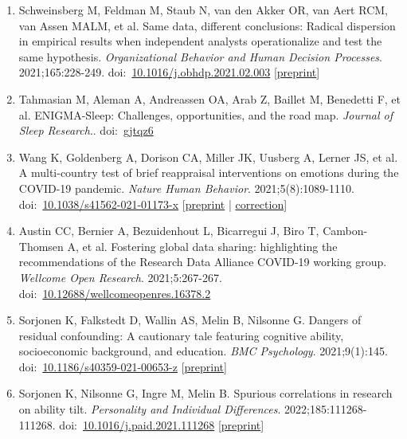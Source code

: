 \documentclass[10pt,a4paper,twocolumn]{article}
\begin{document}
\begin{enumerate}
    \item Schweinsberg M, Feldman M, Staub N, van den Akker OR, van Aert RCM, van Assen MALM, et al. Same data, different conclusions: Radical dispersion in empirical results when independent analysts operationalize and test the same hypothesis. \textit{Organizational Behavior and Human Decision Processes}. 2021;165:228-249. doi:~\href{https://doi.org/10.1016/j.obhdp.2021.02.003}{10.1016/j.obhdp.2021.02.003} [\href{http://repository.essex.ac.uk/id/eprint/29938}{preprint}]

    \item Tahmasian M, Aleman A, Andreassen OA, Arab Z, Baillet M, Benedetti F, et al. ENIGMA-Sleep: Challenges, opportunities, and the road map. \textit{Journal of Sleep Research}.. doi:~\href{https://doi.org/gjtqz6}{gjtqz6}

    \item Wang K, Goldenberg A, Dorison CA, Miller JK, Uusberg A, Lerner JS, et al. A multi-country test of brief reappraisal interventions on emotions during the COVID-19 pandemic. \textit{Nature Human Behavior}. 2021;5(8):1089-1110. doi:~\href{https://doi.org/10.1038/s41562-021-01173-x}{10.1038/s41562-021-01173-x} [\href{https://doi.org/10.31234/osf.io/m4gpq}{preprint} | \href{https://doi.org/10.1038/s41562-022-01441-4}{correction}]

    \item Austin CC, Bernier A, Bezuidenhout L, Bicarregui J, Biro T, Cambon-Thomsen A, et al. Fostering global data sharing: highlighting the recommendations of the Research Data Alliance COVID-19 working group. \textit{Wellcome Open Research}. 2021;5:267-267. doi:~\href{https://doi.org/10.12688/wellcomeopenres.16378.2}{10.12688/wellcomeopenres.16378.2}

    \item Sorjonen K, Falkstedt D, Wallin AS, Melin B, Nilsonne G. Dangers of residual confounding: A cautionary tale featuring cognitive ability, socioeconomic background, and education. \textit{BMC Psychology}. 2021;9(1):145. doi:~\href{https://doi.org/10.1186/s40359-021-00653-z}{10.1186/s40359-021-00653-z} [\href{https://doi.org/10.31234/osf.io/esfx5}{preprint}]

    \item Sorjonen K, Nilsonne G, Ingre M, Melin B. Spurious correlations in research on ability tilt. \textit{Personality and Individual Differences}. 2022;185:111268-111268. doi:~\href{https://doi.org/10.1016/j.paid.2021.111268}{10.1016/j.paid.2021.111268} [\href{https://doi.org/10.31234/osf.io/cg8hd}{preprint}]


\end{enumerate}
\end{document}
